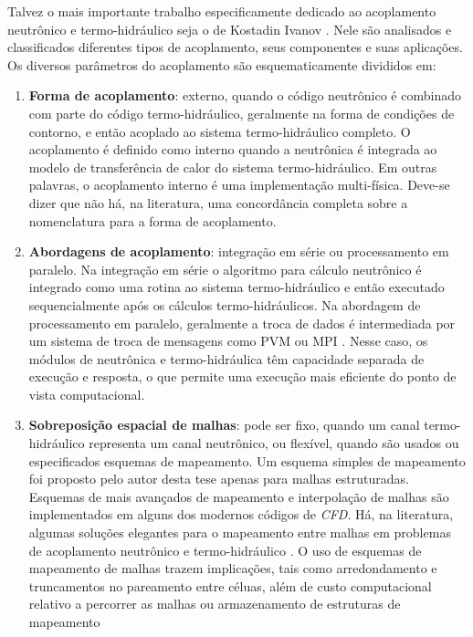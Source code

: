 Talvez o mais importante trabalho especificamente dedicado ao acoplamento 
neutrônico e termo-hidráulico seja o de Kostadin Ivanov \cite{Ivanov2007}. Nele são analisados e classificados diferentes tipos de 
acoplamento, seus componentes e suas aplicações. Os diversos parâmetros do acoplamento são esquematicamente divididos em: 
\begin{enumerate}
\item \textbf{Forma de acoplamento}: externo, quando o código neutrônico é combinado com parte do código termo-hidráulico, 
geralmente na forma de condições de contorno, e então acoplado ao sistema termo-hidráulico completo. O acoplamento 
é definido como interno quando a neutrônica é integrada ao modelo de transferência de calor do sistema termo-hidráulico. 
Em outras palavras, o acoplamento interno é uma implementação multi-física. Deve-se dizer que não há, na literatura, uma
concordância completa sobre a nomenclatura para a forma de acoplamento. 
\item \textbf{Abordagens de acoplamento}: integração em série ou processamento em paralelo. Na integração em série o algoritmo 
para cálculo neutrônico é integrado como uma rotina ao sistema termo-hidráulico e então executado sequencialmente 
após os cálculos termo-hidráulicos. Na abordagem de processamento em paralelo, geralmente a troca de dados é 
intermediada por um sistema de troca de mensagens como PVM \cite{Geist94} ou MPI \cite{Quinn2004}. Nesse caso, os 
módulos de neutrônica e termo-hidráulica têm capacidade separada de execução e resposta, o que permite uma execução 
mais eficiente do ponto de vista computacional.
\item \textbf{Sobreposição espacial de malhas}: pode ser fixo, quando um canal termo-hidráulico representa um canal neutrônico, 
  ou flexível, quando são usados ou especificados esquemas de mapeamento. Um esquema simples de mapeamento foi proposto
  pelo autor desta tese \cite{Silva2015} apenas para malhas estruturadas. Esquemas de mais avançados de mapeamento 
e interpolação de malhas \cite{Beaudoin2008} são implementados em alguns dos modernos códigos de \textit{CFD}.
Há, na literatura, algumas soluções elegantes para o mapeamento entre malhas em problemas de acoplamento neutrônico
e termo-hidráulico \cite{Jareteg2015, Richard2015, Schmidt2015}. O uso de esquemas de mapeamento de malhas trazem
implicações, tais como arredondamento e truncamentos no pareamento
entre céluas, além de custo computacional relativo a percorrer as malhas ou armazenamento de estruturas de mapeamento

\end{enumerate}
